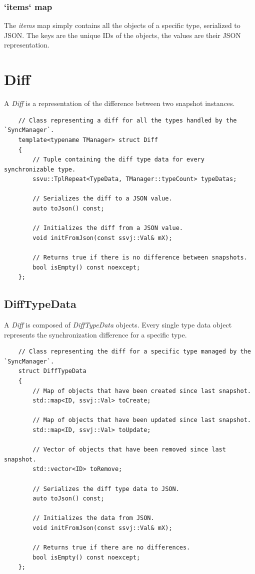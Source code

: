 \documentclass{report}
\def \cppStart {\begin{verbatim}}
\begin{document}
                \subsubsection{`items` map}

                    The \emph{items} map simply contains all the objects of a specific type, serialized to JSON.
                    The keys are the unique IDs of the objects, the values are their JSON representation.
            
        \section{Diff}

            A \emph{Diff} is a representation of the difference between two snapshot instances.

\cppStart
    // Class representing a diff for all the types handled by the `SyncManager`.
    template<typename TManager> struct Diff
    {
        // Tuple containing the diff type data for every synchronizable type.
        ssvu::TplRepeat<TypeData, TManager::typeCount> typeDatas;

        // Serializes the diff to a JSON value.
        auto toJson() const;

        // Initializes the diff from a JSON value.
        void initFromJson(const ssvj::Val& mX);

        // Returns true if there is no difference between snapshots.
        bool isEmpty() const noexcept;
    };
\end{verbatim}

            \subsection{DiffTypeData}

                A \emph{Diff} is composed of \emph{DiffTypeData} objects. 
                Every single type data object represents the synchronization difference for a specific type.

\cppStart
    // Class representing the diff for a specific type managed by the `SyncManager`.
    struct DiffTypeData
    {
        // Map of objects that have been created since last snapshot.
        std::map<ID, ssvj::Val> toCreate;

        // Map of objects that have been updated since last snapshot.
        std::map<ID, ssvj::Val> toUpdate;
        
        // Vector of objects that have been removed since last snapshot.
        std::vector<ID> toRemove;

        // Serializes the diff type data to JSON.
        auto toJson() const;

        // Initializes the data from JSON.
        void initFromJson(const ssvj::Val& mX);

        // Returns true if there are no differences.
        bool isEmpty() const noexcept;
    };
\end{verbatim}
\end{document}
